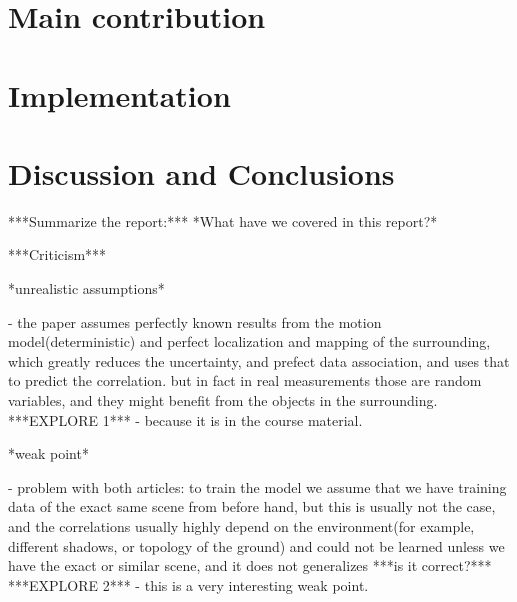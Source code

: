 \documentclass{article}
\begin{document}
	\section{Main contribution}
	\section{Implementation}
	
	\section{Discussion and Conclusions}
	***Summarize the report:***
	*What have we covered in this report?*
	
	***Criticism***
	
	*unrealistic assumptions*
	
	- the paper assumes perfectly known results from the motion model(deterministic) and perfect localization and mapping of the surrounding, which greatly reduces the uncertainty, and prefect data association, and uses that to predict the correlation. but in fact in real measurements those are random variables, and they might benefit from the objects in the surrounding.
	***EXPLORE 1*** - because it is in the course material.
	
	*weak point*
	
	- problem with both articles: to train the model we assume that we have training data of the exact same scene from before hand, but this is usually not the case, and the correlations usually highly depend on the environment(for example, different shadows, or topology of the ground) and could not be learned unless we have the exact or similar scene, and it does not generalizes ***is it correct?***
	***EXPLORE 2*** - this is a very interesting weak point.
	
\end{document}
